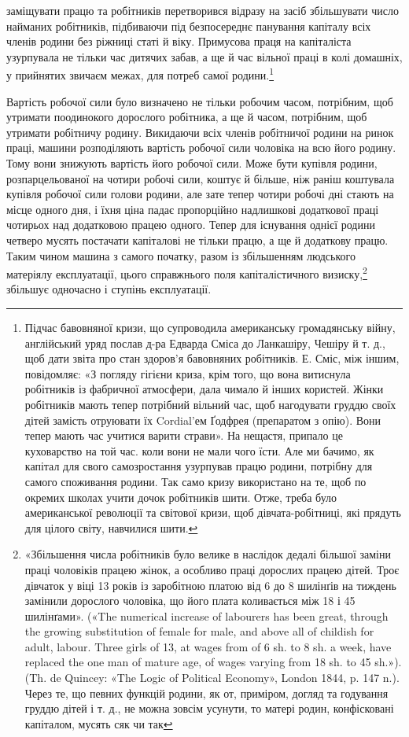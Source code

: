 \parcont{}  %
заміщувати працю та робітників перетворився відразу на засіб
збільшувати число найманих робітників, підбиваючи під безпосереднє
панування капіталу всіх членів родини без ріжниці статі
й віку. Примусова праця на капіталіста узурпувала не тільки час
дитячих забав, а ще й час вільної праці в колі домашніх, у прийнятих
звичаєм межах, для потреб самої родини.\footnote{
Підчас бавовняної кризи, що супроводила американську громадянську
війну, англійський уряд послав д-ра Едварда Сміса до Ланкашіру,
Чешіру й т. д., щоб дати звіта про стан здоров’я бавовняних робітників.
Е. Сміс, між іншим, повідомляє: «З погляду гігієни криза, крім
того, що вона витиснула робітників із фабричної атмосфери, дала чимало
й інших користей. Жінки робітників мають тепер потрібний вільний
час, щоб нагодувати груддю своїх дітей замість отруювати їх Cordial’ем
Ґодфрея (препаратом з опію). Вони тепер мають час учитися варити страви».
На нещастя, припало це куховарство на той час. коли вони не мали
чого їсти. Але ми бачимо, як капітал для свого самозростання узурпував
працю родини, потрібну для самого споживання родини. Так само кризу
використано на те, щоб по окремих школах учити дочок робітників шити.
Отже, треба було американської революції та світової кризи, щоб дівчата-робітниці,
які прядуть для цілого світу, навчилися шити.
}

Вартість робочої сили було визначено не тільки робочим
часом, потрібним, щоб утримати поодинокого дорослого робітника,
а ще й часом, потрібним, щоб утримати робітничу родину.
Викидаючи всіх членів робітничої родини на ринок праці, машини
розподіляють вартість робочої сили чоловіка на всю його родину.
Тому вони знижують вартість його робочої сили. Може бути купівля
родини, розпарцельованої на чотири робочі сили, коштує й
більше, ніж раніш коштувала купівля робочої сили голови родини,
але зате тепер чотири робочі дні стають на місце одного дня, і їхня
ціна падає пропорційно надлишкові додаткової праці чотирьох
над додатковою працею одного. Тепер для існування однієї родини
четверо мусять постачати капіталові не тільки працю, а ще й
додаткову працю. Таким чином машина з самого початку, разом
із збільшенням людського матеріялу експлуатації, цього справжнього
поля капіталістичного визиску,\footnote{
«Збільшення числа робітників було велике в наслідок дедалі
більшої заміни праці чоловіків працею жінок, а особливо праці дорослих
працею дітей. Троє дівчаток у віці 13 років із заробітною платою від 6
до 8 шилінґів на тиждень замінили дорослого чоловіка, що його плата
коливається між 18 і 45 шилінґами». («The numerical increase of labourers
has been great, through the growing substitution of female for male, and
above all of childish for adult, labour. Three girls of 13, at wages from of
6 sh. to 8 sh. a week, have replaced the one man of mature age, of wages
varying from 18 sh. to 45 sh.»). (Th. de Quincey: «The Logic of Political
Economy», London 1844, p. 147 n.). Через те, що певних функцій родини,
як от, приміром, догляд та годування груддю дітей і т. д., не можна зовсім
усунути, то матері родин, конфісковані капіталом, мусять сяк чи так
} збільшує одночасно і
ступінь експлуатації.

